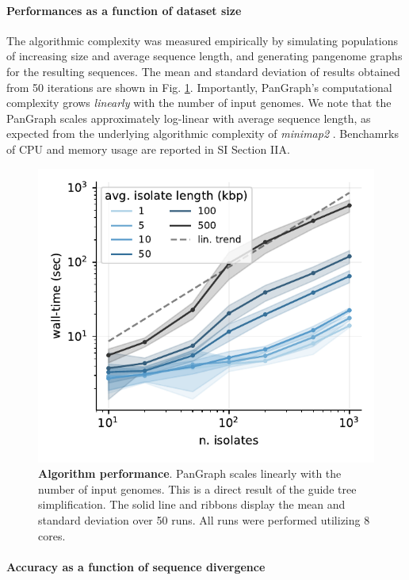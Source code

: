 \documentclass[aps,rmp,reprint,superscriptaddress,notitlepage,10pt]{revtex4-1}
\begin{document}
\paragraph*{Performances as a function of dataset size}

The algorithmic complexity was measured empirically by simulating populations of increasing size and average sequence length, and generating pangenome graphs for the resulting sequences.
The mean and standard deviation of results obtained from 50 iterations are shown in Fig. \ref{fig:toy-performance}.
Importantly, PanGraph's computational complexity grows \emph{linearly} with the number of input genomes.
We note that the PanGraph scales approximately log-linear with average sequence length, as expected from the underlying algorithmic complexity of \textit{minimap2} \cite{li2018minimap2}.
Benchamrks of CPU and memory usage are reported in SI Section IIA.

\begin{figure}[htb]
    \includegraphics[width=.4\textwidth]{figs/benchmark.pdf}
    \caption{{\bf Algorithm performance}.
        PanGraph scales linearly with the number of input genomes.
        This is a direct result of the guide tree simplification.
        The solid line and ribbons display the mean and standard deviation over 50 runs.
        All runs were performed utilizing 8 cores.
    }
    \label{fig:toy-performance}
\end{figure}

\paragraph*{Accuracy as a function of sequence divergence}
\end{document}
